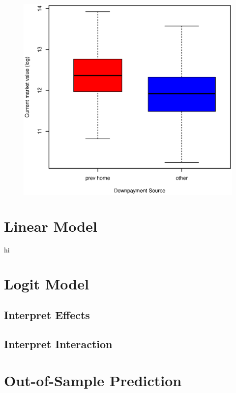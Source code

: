 \documentclass[11pt, fleqn]{article}
\begin{document}
\begin{figure}[!htb]
  \centering
  \includegraphics[scale=.5]{dwnpay.eps}
  \caption{}
  \label{fig:dwnpay}
\end{figure}

\section{Linear Model}


hi

\section{Logit Model}

\subsection{Interpret Effects}


\subsection{Interpret Interaction}


\section{Out-of-Sample Prediction}
\end{document}

